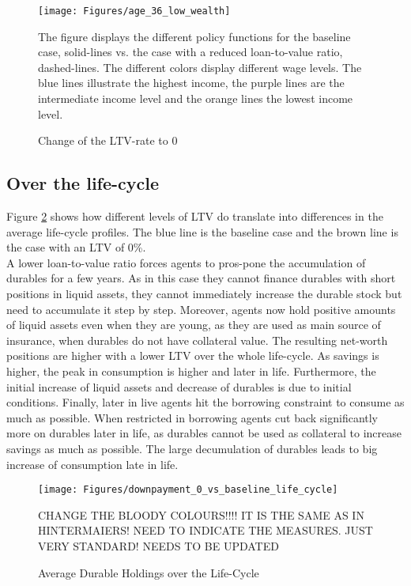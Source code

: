 \documentclass[a4paper,12pt,legno]{article}
\begin{document}
\begin{figure}[!htbp]
\caption{Change of the LTV-rate to $0$} 
\label{policy_downpayment0_age36}	%
\centering
\texttt{[image: Figures/age\_36\_low\_wealth]}  %

\begin{minipage}{0.8\linewidth}
\footnotesize{The figure displays the different policy functions for the baseline case, solid-lines vs. the case with a reduced loan-to-value ratio, dashed-lines. The different colors display different wage levels. The blue lines illustrate the highest income, the purple lines are the intermediate income level and the orange lines the lowest income level.}
\end{minipage}

\end{figure}

\subsection{Over the life-cycle}
Figure \ref{downpayment_vs_baseline_lc} shows how different levels of LTV do translate into differences in the average life-cycle profiles. The blue line is the baseline case and the brown line is the case with an LTV of 0\%. \\ A lower loan-to-value ratio forces agents to  pros-pone the accumulation of durables for a few years. As in this case they cannot finance durables with short positions in liquid assets, they cannot immediately increase the durable stock but need to accumulate it step by step. Moreover, agents now hold positive amounts of liquid assets even when they are young, as they are used as main source of insurance, when durables do not have collateral value. The resulting net-worth positions are higher with a lower LTV over the whole life-cycle. As savings is higher, the peak in consumption is higher and later in life.
Furthermore, the initial increase of liquid assets and decrease of durables is due to initial conditions. Finally, later in live agents hit the borrowing constraint to consume as much as possible. When restricted in borrowing agents cut back significantly more on durables later in life, as durables cannot be used as collateral to increase savings as much as possible. The large decumulation of durables leads to big increase of consumption late in life. 


\begin{figure}[!htbp]
\caption{Average Durable Holdings over the Life-Cycle} 
\label{downpayment_vs_baseline_lc}	%
\centering
\texttt{[image: Figures/downpayment\_0\_vs\_baseline\_life\_cycle]}  %

\begin{minipage}{0.8\linewidth}
\footnotesize{CHANGE THE BLOODY COLOURS!!!! IT IS THE SAME AS IN HINTERMAIERS! NEED TO INDICATE THE MEASURES. JUST VERY STANDARD! NEEDS TO BE UPDATED}
\end{minipage}

\end{figure}
\end{document}
